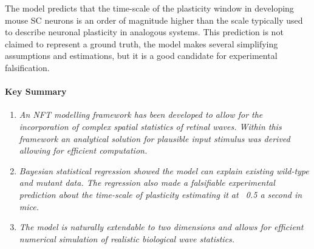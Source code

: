 The model predicts that the time-scale of the plasticity window in developing mouse SC neurons is an order of magnitude higher than the scale typically used to describe neuronal plasticity in analogous systems. This prediction is not claimed to represent a ground truth, the model makes several simplifying assumptions and estimations, but it is a good candidate for experimental falsification.
\paragraph{Key Summary}

\begin{enumerate}
	\item \textit{An NFT modelling framework has been developed to allow for the incorporation of complex spatial statistics of retinal waves. Within this framework an analytical solution for plausible input stimulus was derived allowing for efficient computation.}
	\item \textit{Bayesian statistical regression showed the model can explain existing wild-type and mutant data. The regression also made a falsifiable experimental prediction about the time-scale of plasticity estimating it at ~0.5 a second in mice.}
	\item \textit{The model is naturally extendable to two dimensions and allows for efficient numerical simulation of realistic biological wave statistics.}
\end{enumerate}